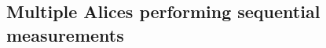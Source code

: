 \documentclass[pra,a4paper,aps,twocolumn,showpacs,superscriptaddress,groupedaddress]{revtex4}
\begin{document}








\subsection{Multiple Alices performing sequential measurements}\label{mm}
 
\end{document}
